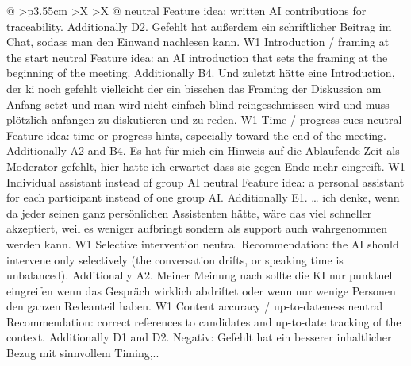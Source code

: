 \begin{xltabular}{\textwidth}{@{}
      >{\RaggedRight\arraybackslash}p{3.55cm}
      >{\RaggedRight\arraybackslash}X
      >{\RaggedRight\arraybackslash}X
    @{}}
      {neutral}
      {Feature idea: written AI contributions for traceability.}
      {Additionally D2.}
      {Gefehlt hat außerdem ein schriftlicher Beitrag im Chat, sodass man den
      Einwand nachlesen kann.}
    \cbgap
    \cbrow
      {W1}
      {Introduction / framing at the start}
      {neutral}
      {Feature idea: an AI introduction that sets the framing at the beginning of
      the meeting.}
      {Additionally B4.}
      {Und zuletzt hätte eine Introduction, der ki noch gefehlt vielleicht der ein
      bisschen das Framing der Diskussion am Anfang setzt und man wird nicht
      einfach blind reingeschmissen wird und muss plötzlich anfangen zu
      diskutieren und zu reden.}
    \cbgap
    \cbrow
      {W1}
      {Time / progress cues}
      {neutral}
      {Feature idea: time or progress hints, especially toward the end of the
      meeting.}
      {Additionally A2 and B4.}
      {Es hat für mich ein Hinweis auf die Ablaufende Zeit als Moderator gefehlt,
      hier hatte ich erwartet dass sie gegen Ende mehr eingreift.}
    \cbgap
    \cbrow
      {W1}
      {Individual assistant instead of group AI}
      {neutral}
      {Feature idea: a personal assistant for each participant instead of one group
      AI.}
      {Additionally E1.}
      {… ich denke, wenn da jeder seinen ganz persönlichen Assistenten hätte, wäre
      das viel schneller akzeptiert, weil es weniger aufbringt sondern als support
      auch wahrgenommen werden kann.}
    \cbgap
    \cbrow
      {W1}
      {Selective intervention}
      {neutral}
      {Recommendation: the AI should intervene only selectively (the conversation
      drifts, or speaking time is unbalanced).}
      {Additionally A2.}
      {Meiner Meinung nach sollte die KI nur punktuell eingreifen wenn das Gespräch
      wirklich abdriftet oder wenn nur wenige Personen den ganzen Redeanteil
      haben.}
    \cbgap
    \cbrow
      {W1}
      {Content accuracy / up-to-dateness}
      {neutral}
      {Recommendation: correct references to candidates and up-to-date tracking of
      the context.}
      {Additionally D1 and D2.}
      {Negativ: Gefehlt hat ein besserer inhaltlicher Bezug mit sinnvollem Timing,..}
  \end{xltabular}
\endgroup
